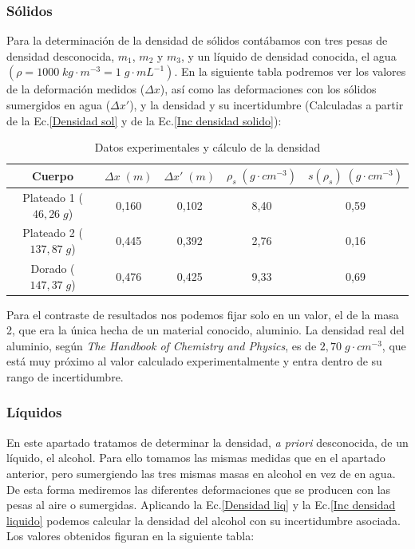 \documentclass[a4paper,12pt,titlepage]{article}
\begin{document}
\subsubsection{Sólidos}

Para la determinación de la densidad de sólidos contábamos con tres pesas de densidad desconocida, $m_1$, $m_2$ y $m_3$, y un líquido de densidad conocida, el agua $(\rho = 1000 \; kg\cdot m^{-3}=1 \; g\cdot mL^{-1})$. En la siguiente tabla podremos ver los valores de la deformación medidos ($\Delta x$), así como las deformaciones con los sólidos sumergidos en agua ($\Delta x'$), y la densidad y su incertidumbre (Calculadas a partir de la Ec.\ref{Densidad sol} y de la Ec.\ref{Inc densidad solido}):

\begin{table}[h!]
    \centering
    \begin{tabular}{c|c|c|c|c|}
    \cline{1-5}
    \multicolumn{1}{|c|}{Cuerpo}        & $\Delta x \; (m)$ & $\Delta x' \; (m)$ & $\rho_s \; (g\cdot cm^{-3})$ & $s(\rho_s) \; (g\cdot cm^{-3})$ \\ \hline
    \multicolumn{1}{|c|}{Plateado 1 ($46,26 \; g$)} & 0,160  & 0,102 & 8,40 & 0,59 \\ \hline
    \multicolumn{1}{|c|}{Plateado 2 ($137,87 \; g$)} & 0,445 & 0,392 & 2,76 & 0,16 \\ \hline
    \multicolumn{1}{|c|}{Dorado ($147,37 \; g$)} & 0,476 & 0,425 & 9,33 & 0,69 \\ \hline
    \end{tabular}
    \caption{Datos experimentales y cálculo de la densidad}
    \label{Datos dens sol}
\end{table}

\newpage

Para el contraste de resultados nos podemos fijar solo en un valor, el de la masa 2, que era la única hecha de un material conocido, aluminio. La densidad real del aluminio, según \textit{The Handbook of Chemistry and Physics}, es de $2,70 \; g\cdot cm^{-3}$, que está muy próximo al valor calculado experimentalmente y entra dentro de su rango de incertidumbre.

\subsubsection{Líquidos}

En este apartado tratamos de determinar la densidad, \textit{a priori} desconocida, de un líquido, el alcohol. Para ello tomamos las mismas medidas que en el apartado anterior, pero sumergiendo las tres mismas masas en alcohol en vez de en agua. De esta forma mediremos las diferentes deformaciones que se producen con las pesas al aire o sumergidas. Aplicando la Ec.\ref{Densidad liq} y la Ec.\ref{Inc densidad liquido} podemos calcular la densidad del alcohol con su incertidumbre asociada. Los valores obtenidos figuran en la siguiente tabla:
\end{document}
